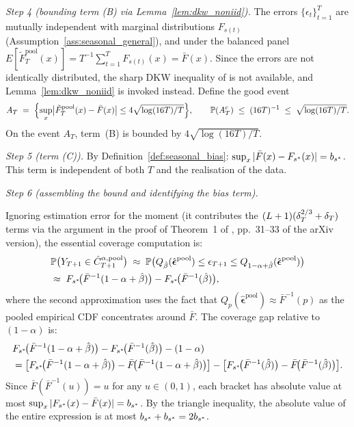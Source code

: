 \medskip
\noindent\textit{Step 4 (bounding term (B) via
Lemma~\ref{lem:dkw_noniid}).}
The errors $\{\epsilon_t\}_{t=1}^T$ are mutually independent
with marginal distributions $F_{s(t)}$
(Assumption~\ref{ass:seasonal_general}), and under the balanced panel
$E[\tilde{F}_T^{\text{pool}}(x)]
= T^{-1}\sum_{t=1}^T F_{s(t)}(x) = \bar{F}(x)$.
Since the errors are not identically distributed, the sharp DKW
inequality of \citet{massart1990tight} is not available, and
Lemma~\ref{lem:dkw_noniid} is invoked instead.  Define the good event
\[
  A_T \;=\;
  \Bigl\{\sup_x\bigl|\tilde{F}_T^{\text{pool}}(x)-\bar{F}(x)\bigr|
  \leq 4\sqrt{\log(16T)/T}\Bigr\},
  \qquad
  \mathbb{P}(A_T^c) \;\leq\; (16T)^{-1} \;\leq\; \sqrt{\log(16T)/T}.
\]
On the event $A_T$, term~(B) is bounded by
$4\sqrt{\log(16T)/T}$.

\medskip
\noindent\textit{Step 5 (term (C)).}
By Definition~\ref{def:seasonal_bias}:
$\sup_x|\bar{F}(x) - F_{s^*}(x)| = b_{s^*}$.
This term is independent of both $T$ and the realisation of the data.

\medskip
\noindent\textit{Step 6 (assembling the bound and identifying the bias term).}

Ignoring estimation error for the moment (it contributes the $(L+1)(\delta_T^{2/3}+\delta_T)$ terms via the argument in the proof of Theorem~1 of \citealt{xu2023conformal}, pp.~31--33 of the arXiv version), the essential coverage computation is:
\begin{align}
  &\mathbb{P}\bigl(Y_{T+1} \in \hat{C}_{T+1}^{\alpha,\text{pool}}\bigr)
  \;\approx\;
  \mathbb{P}\bigl(Q_{\hat\beta}(\hat{\boldsymbol\epsilon}^{\text{pool}})
             \leq \epsilon_{T+1} \leq
             Q_{1-\alpha+\hat\beta}(\hat{\boldsymbol\epsilon}^{\text{pool}})\bigr)
  \notag\\
  &\approx\;
  F_{s^*}\!\bigl(\bar{F}^{-1}(1-\alpha+\hat\beta)\bigr)
  - F_{s^*}\!\bigl(\bar{F}^{-1}(\hat\beta)\bigr),
  \label{eq:cov_approx}
\end{align}
where the second approximation uses the fact that
$Q_p(\hat{\boldsymbol\epsilon}^{\text{pool}}) \approx \bar{F}^{-1}(p)$ as
the pooled empirical CDF concentrates around $\bar{F}$.
The coverage gap relative to $(1-\alpha)$ is:
\begin{align*}
  &F_{s^*}\!\bigl(\bar{F}^{-1}(1-\alpha+\hat\beta)\bigr)
   - F_{s^*}\!\bigl(\bar{F}^{-1}(\hat\beta)\bigr)
   - (1-\alpha) \\
  &=\bigl[F_{s^*}\!\bigl(\bar{F}^{-1}(1-\alpha+\hat\beta)\bigr)
      - \bar{F}\!\bigl(\bar{F}^{-1}(1-\alpha+\hat\beta)\bigr)\bigr]
   - \bigl[F_{s^*}\!\bigl(\bar{F}^{-1}(\hat\beta)\bigr)
      - \bar{F}\!\bigl(\bar{F}^{-1}(\hat\beta)\bigr)\bigr].
\end{align*}
Since $\bar{F}(\bar{F}^{-1}(u)) = u$ for any $u \in (0,1)$, each
bracket has absolute value at most
$\sup_x|F_{s^*}(x) - \bar{F}(x)| = b_{s^*}$.
By the triangle inequality, the absolute value of the entire
expression is at most $b_{s^*} + b_{s^*} = 2b_{s^*}$.

